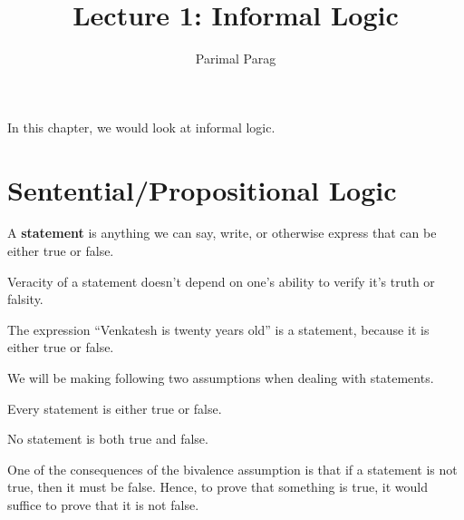 \documentclass[]{article}
\title{Lecture 1: Informal Logic}
\author{Parimal Parag}
\begin{document}
\maketitle
In this chapter, we would look at informal logic.
\section{Sentential/Propositional Logic}
\begin{defn}[Statement] A \textbf{statement} is anything we can say, write, or otherwise express that can be either true or false. 
\end{defn}
\begin{rem} Veracity of a statement doesn't depend on one's ability to verify it's truth or falsity.
\end{rem}
\begin{exmp}
The expression ``Venkatesh is twenty years old'' is a statement, because it is either true or false.
\end{exmp}
We will be making following two assumptions when dealing with statements.
\begin{assum}[Bivalence] Every statement is either true or false.
\end{assum}
\begin{assum} No statement is both true and false.
\end{assum}
One of the consequences of the bivalence assumption is that if a statement is not true, then it must be false. Hence, to prove that something is true, it would suffice to prove that it is not false.
	
\end{document}
